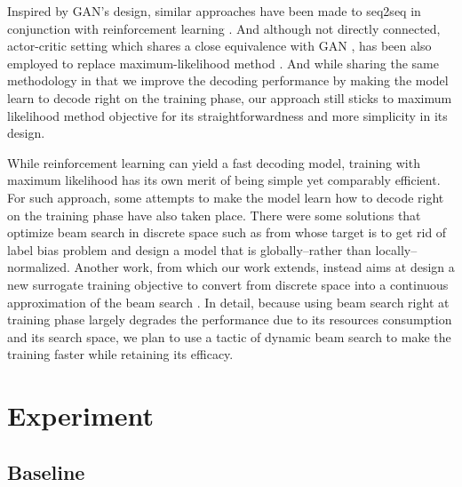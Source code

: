 \documentclass[11pt,a4paper]{article}
\begin{document}
Inspired by GAN's design, similar approaches have been made to seq2seq in conjunction with reinforcement learning \cite{kusner2016gans, yu2017seqgan,gu2017neural, gumbel2017}. And although not directly connected, actor-critic setting which shares a close equivalence with GAN \cite{pfau2016connecting}, has been also employed to replace maximum-likelihood method \cite{bahdanau2017actor}. And while sharing the same methodology in that we improve the decoding performance by making the model learn to decode right on the training phase, our approach still sticks to maximum likelihood method objective for its straightforwardness and more simplicity in its design.  

While reinforcement learning can yield a fast decoding model, training with maximum likelihood has its own merit of being simple yet comparably efficient. For such approach, some attempts to make the model learn how to decode right on the training phase have also taken place. There were some solutions that optimize beam search in discrete space such as from \citet{wiseman2016sequence, andor2016globally} whose target is to get rid of label bias problem and design a model that is globally--rather than locally--normalized. Another work, from which our work extends, instead aims at design a new surrogate training objective to convert from discrete space into a continuous approximation of the beam search \cite{goyal2018continuous}. In detail, because using beam search right at training phase largely degrades the performance due to its resources consumption and its search space, we plan to use a tactic of dynamic beam search \cite{buckman2016transition} to make the training faster while retaining its efficacy. 

\section{Experiment}
\subsection{Baseline} \label{ssec:baseline}
\end{document}

